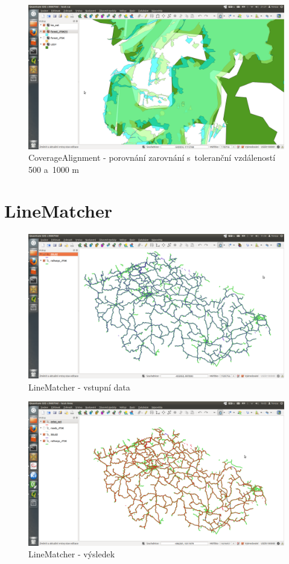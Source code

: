   \begin{figure}[H]
    \centering
      \includegraphics[width=400pt]{./pictures/test-ca4.png}
      \caption[CoverageAlignment- porovnání]{CoverageAlignment 
	- porovnání zarovnání s~toleranční vzdáleností 500 a~1000 m}
      \label{fig:ca4}
  \end{figure}

\section{LineMatcher}
\label{ukazky-lm}

  \begin{figure}[H]
    \centering
      \includegraphics[width=400pt]{./pictures/test-lm1.png}
      \caption{LineMatcher - vstupní data}
      \label{fig:lm1}
  \end{figure}

  \begin{figure}[H]
    \centering
      \includegraphics[width=400pt]{./pictures/test-lm2.png}
      \caption{LineMatcher - výsledek}
      \label{fig:lm2}
  \end{figure}  

